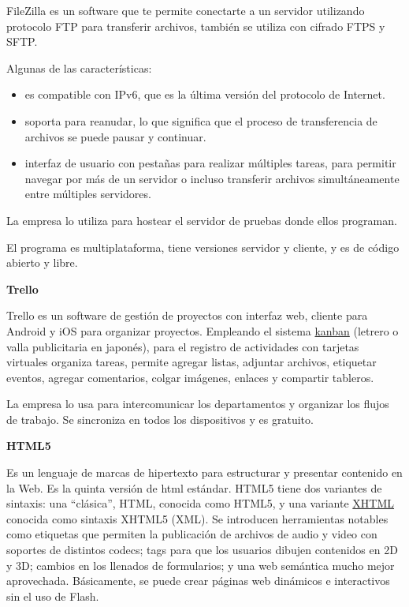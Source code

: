 \documentclass{article}
\begin{document}
FileZilla es un software que te permite conectarte a un servidor utilizando protocolo FTP para transferir archivos, también se utiliza con cifrado FTPS y SFTP.  

Algunas de las características:  

\begin{itemize}
\item es compatible con IPv6, que es la última versión del protocolo de Internet.
\item soporta para reanudar, lo que significa que el proceso de transferencia de archivos se puede pausar y continuar.
\item interfaz de usuario con pestañas para realizar múltiples tareas, para permitir navegar por más de un servidor o incluso transferir archivos simultáneamente entre múltiples servidores.
\end{itemize}      

La empresa lo utiliza para hostear el servidor de pruebas donde ellos programan.   

El programa es multiplataforma, tiene versiones servidor y cliente, y es de código abierto y libre.

\vspace{5mm}

\textbf{Trello}

Trello es un software de gestión de proyectos con interfaz web, cliente para Android y iOS para organizar proyectos. Empleando el sistema \href{https://es.wikipedia.org/wiki/Kanban}{kanban} (letrero o valla publicitaria en japonés), para el registro de actividades con tarjetas virtuales organiza tareas, permite agregar listas, adjuntar archivos, etiquetar eventos, agregar comentarios, colgar imágenes, enlaces y compartir tableros. 

La empresa lo usa para intercomunicar los departamentos y organizar los flujos de trabajo. Se sincroniza en todos los dispositivos y es gratuito.

\vspace{5mm}

\textbf{HTML5}

Es un lenguaje de marcas de hipertexto para estructurar y presentar contenido en la Web.  Es la quinta versión de html estándar. HTML5 tiene dos variantes de sintaxis: una “clásica”, HTML, conocida como HTML5, y una variante \href{https://es.wikipedia.org/wiki/XHTML}{XHTML} conocida como sintaxis XHTML5 (XML). Se introducen herramientas notables como etiquetas que permiten la publicación de archivos de audio y video con soportes de distintos codecs; tags para que los usuarios dibujen contenidos en 2D y 3D; cambios en los llenados de formularios; y una web semántica mucho mejor aprovechada. Básicamente, se puede crear páginas web dinámicos e interactivos sin el uso de Flash. 
\end{document}
